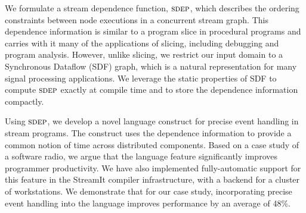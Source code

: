 We formulate a stream dependence function, $\textsc{sdep}$, which describes
the ordering constraints between node executions in a concurrent
stream graph. This dependence information is similar to a program
slice in procedural programs and carries with it many of the
applications of slicing, including debugging and program analysis.
However, unlike slicing, we restrict our input domain to a Synchronous
Dataflow (SDF) graph, which is a natural representation for many
signal processing applications.  We leverage the static properties of
SDF to compute $\textsc{sdep}$ exactly at compile time and to store the
dependence information compactly.

Using $\textsc{sdep}$, we develop a novel language construct for precise event
handling in stream programs.  The construct uses the dependence
information to provide a common notion of time across distributed
components.  Based on a case study of a software radio, we argue that
the language feature significantly improves programmer
productivity. We have also implemented fully-automatic support for
this feature in the StreamIt compiler infrastructure, with a backend
for a cluster of workstations.  We demonstrate that for our case
study, incorporating precise event handling into the language improves
performance by an average of 48\%.

